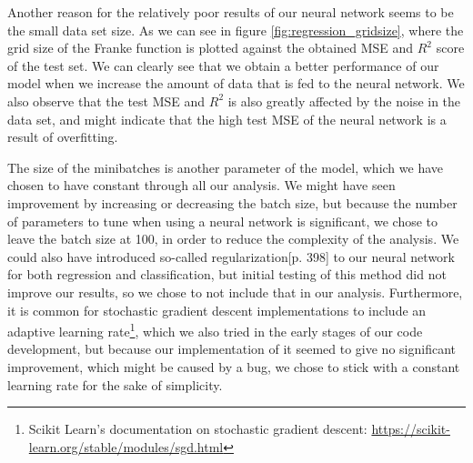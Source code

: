 Another reason for the relatively poor results of our neural network seems to be the small data set size.  As we can see in figure \ref{fig:regression_gridsize}, where the grid size of the Franke function is plotted against the obtained MSE and $R^2$ score of the test set. We can clearly see that we obtain a better performance of our model when we increase the amount of data that is fed to the neural network. We also observe that the test MSE and $R^2$ is also greatly affected by the noise in the data set, and might indicate that the high test MSE of the neural network is a result of overfitting.

The size of the minibatches is another parameter of the model, which we have chosen to have constant through all our analysis. We might have seen improvement by increasing or decreasing the batch size, but because the number of parameters to tune when using a neural network is significant, we chose to leave the batch size at 100, in order to reduce the complexity of the analysis. We could also have introduced so-called regularization\cite{hastie}[p. 398] to our neural network for both regression and classification, but initial testing of this method did not improve our results, so we chose to not include that in our analysis. Furthermore, it is common for stochastic gradient descent implementations to include an adaptive learning rate\footnote{Scikit Learn's documentation on stochastic gradient descent: \href{https://scikit-learn.org/stable/modules/sgd.html}{https://scikit-learn.org/stable/modules/sgd.html}}, which we also tried in the early stages of our code development, but because our implementation of it seemed to give no significant improvement, which might be caused by a bug, we chose to stick with a constant learning rate for the sake of simplicity.
